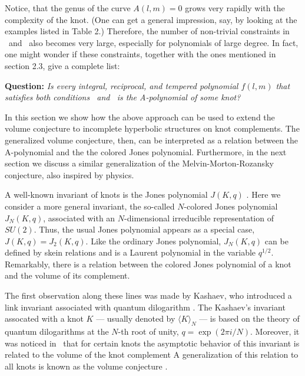 \endexample

Notice, that the genus of the curve $A(l,m)=0$ grows very rapidly
with the complexity of the knot. (One can get a general impression,
say, by looking at the examples listed in Table 2.)
Therefore, the number of non-trivial constraints in
\sobstruction\ and \kobstruction\ also becomes very large,
especially for polynomials of large degree.
In fact, one might wonder if these constraints, together with
the ones mentioned in section 2.3, give a complete list:

{\bf Question:}
{\it Is every integral, reciprocal, and tempered polynomial $f(l,m)$
that satisfies both conditions \sobstruction\ and \kobstruction\
is the A-polynomial of some knot?}




In this section
we show how the above approach
can be used to extend the volume conjecture to
incomplete hyperbolic structures on knot
complements.
The generalized volume conjecture, then, can be interpreted
as a relation between the A-polynomial and
the the colored Jones polynomial.
Furthermore, in the next section we discuss a similar generalization
of the Melvin-Morton-Rozansky conjecture, also inspired by physics.


A well-known invariant of knots is
the Jones polynomial $J (K,q)$ \Jones.
Here we consider a more general invariant, the so-called
$N$-colored Jones polynomial $J_N (K,q)$, associated with
an $N$-dimensional irreducible representation of $SU(2)$.
Thus, the usual Jones polynomial appears as a special case,
$J (K,q) = J_2 (K,q)$.
Like the ordinary Jones polynomial, $J_N (K,q)$ can be defined by
skein relations and is a Laurent polynomial in the variable $q^{1/2}$.
Remarkably, there is a relation between the colored Jones
polynomial of a knot and the volume of its complement.

The first observation along these lines was made by Kashaev, who
introduced a link invariant associated with quantum dilogarithm \Kashaev.
The Kashaev's invariant assocated with a knot $K$ --- usually denoted
by $\langle K \rangle_N$ --- is based on the theory of quantum
dilogarithms at the $N$-th root of unity, $q = \exp (2\pi i/N)$.
Moreover, it was noticed in \Kashaev\ that for certain knots
the asymptotic behavior of this invariant is related
to the volume of the knot complement
%
\eqn{}
%
A generalization of this relation to all knots
is known as the volume conjecture \Kashaev.

